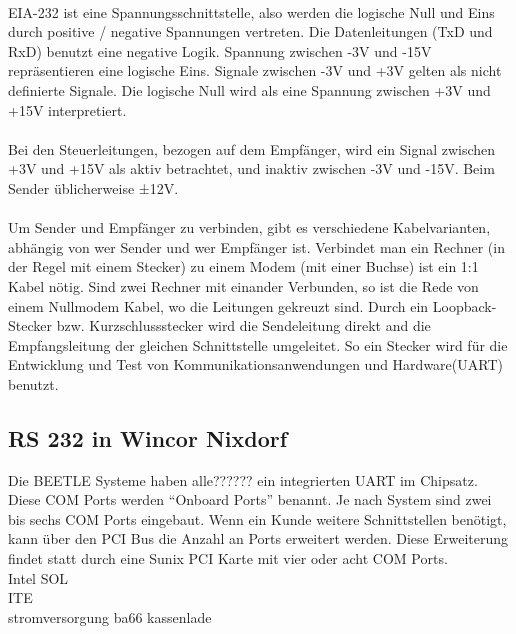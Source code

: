 \paragraph{}
EIA-232 ist eine Spannungsschnittstelle, also werden die logische Null und Eins durch positive / negative Spannungen vertreten. Die Datenleitungen (TxD und RxD) benutzt eine negative Logik. Spannung zwischen -3V und -15V repräsentieren eine logische Eins. Signale zwischen -3V und +3V gelten als nicht definierte Signale. Die logische Null wird als eine Spannung zwischen +3V und +15V interpretiert. 
 
\paragraph{}
Bei den Steuerleitungen, bezogen auf dem Empfänger, wird ein Signal zwischen +3V und +15V als aktiv betrachtet, und inaktiv zwischen -3V und -15V. Beim Sender üblicherweise ±12V.

\paragraph{}
Um Sender und Empfänger zu verbinden, gibt es verschiedene Kabelvarianten, abhängig von wer Sender und wer Empfänger ist. Verbindet man ein Rechner (in der Regel mit einem Stecker) zu einem Modem (mit einer Buchse) ist ein 1:1 Kabel nötig. Sind zwei Rechner mit einander Verbunden, so ist die Rede von einem Nullmodem Kabel, wo die Leitungen gekreuzt sind. Durch ein Loopback-Stecker bzw. Kurzschlussstecker wird die Sendeleitung direkt and die Empfangsleitung der gleichen Schnittstelle umgeleitet. So ein Stecker wird für die Entwicklung und Test von Kommunikationsanwendungen und Hardware(UART) benutzt.


\subsection{RS 232 in Wincor Nixdorf}
Die BEETLE Systeme haben alle?????? ein integrierten UART im Chipsatz. Diese COM Ports werden "`Onboard Ports"' benannt. Je nach System sind zwei bis sechs COM Ports eingebaut. Wenn ein Kunde weitere Schnittstellen benötigt, kann über den PCI Bus die Anzahl an Ports erweitert werden. Diese Erweiterung findet statt durch eine Sunix PCI Karte mit vier oder acht COM Ports.
\\
Intel SOL 
\\
ITE
\\
stromversorgung
ba66
kassenlade

